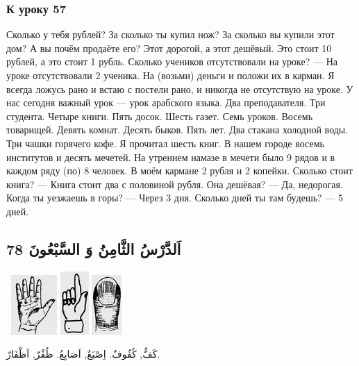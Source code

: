\documentclass[a5paper]{article}
\begin{document}
\subsubsection{К уроку 57}
Сколько у тебя рублей? За сколько ты купил нож? За сколько вы купили этот дом? А вы почём продаёте его? Этот дорогой, а этот дешёвый. Это стоит 10 рублей, а это стоит 1 рубль. Сколько учеников отсутствовали на уроке? — На уроке отсутствовали 2 ученика. На (возьми) деньги и положи их в карман. Я всегда ложусь рано и встаю с постели рано, и никогда не отсутствую на уроке. У нас сегодня важный урок — урок арабского языка. Два преподавателя. Три студента. Четыре книги. Пять досок. Шесть газет. Семь уроков. Восемь товарищей. Девять комнат. Десять быков. Пять лет. Два стакана холодной воды. Три чашки горячего кофе. Я прочитал шесть книг. В нашем городе восемь институтов и десять мечетей. На утреннем намазе в мечети было 9 рядов и в каждом ряду (по) 8 человек. В моём кармане 2 рубля и 2 копейки. Сколько стоит книга? — Книга стоит два с половиной рубля. Она дешёвая? — Да, недорогая. Когда ты уезжаешь в горы? — Через 3 дня. Сколько дней ты там бу­дешь? — 5 дней.

\subsection{اَلدَّرْسُ الثَّامِنُ وَ السَّبْعُونَ 78}
\  \includegraphics[width=0.6874in,height=0.8957in]{images/MuhammadBagauddinprettified-img229.png}   \includegraphics[width=0.4272in,height=0.948in]{images/MuhammadBagauddinprettified-img230.png}   \includegraphics[width=0.448in,height=0.8957in]{images/MuhammadBagauddinprettified-img231.png} 

كَفٌّ, كُفُوفٌ. اِصْبَعٌ, اَصَابِعُ. ظُفْرٌ, اَظْفَارٌ. 
\end{document}
